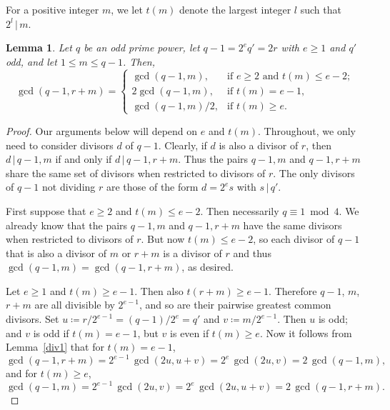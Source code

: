 \documentclass[12pt]{article}
\newtheorem{lemma}[theorem]{Lemma}
\theoremstyle{definition}\newtheorem{definition}{Definition}[section]
\begin{document}
For a positive integer $m$, we let $t(m)$ denote the largest integer $l$ such that $2^l\,|\,m$. 

\begin{lemma}
\label{gcdlem}
Let $q$ be an odd prime power, let $q-1=2^{e}q'=2r$ with $e\geq 1$ and $q'$ odd, and let $1\leq m\leq q-1$. Then, 
\[
	\gcd(q - 1, r + m) = \begin{cases}
		\gcd(q - 1, m), & \text{if $e \geq 2$ and $t(m) \leq e - 2$}; \\ 
		2\gcd(q - 1, m), & \text{if $t(m) = e - 1$}, \\ 
		\gcd(q - 1, m)/2, & \text{if $t(m) \geq e$}.
	\end{cases}
\]
\end{lemma}

\begin{proof}
Our arguments below will depend on $e$ and $t(m)$. Throughout, we only need to consider divisors $d$ of $q-1$. Clearly, if $d$ is also a divisor of $r$, then $d\,|\,q-1,m$ if and only if $d\,|\,q-1, r+m$. Thus the pairs $q-1,m$ and $q-1,r+m$ share the same set of divisors when restricted to divisors of $r$. The only divisors of $q-1$ not dividing $r$ are those of the form $d=2^e s$ with $s\,|\,q'$. 

First suppose that $e\geq 2$ and $t(m)\leq e-2$. Then necessarily $q\equiv 1 \bmod 4$. We already know that the pairs $q-1,m$ and $q-1,r+m$ have the same divisors when restricted to divisors of $r$. But now $t(m)\leq e-2$, so each divisor of $q-1$ that is also a divisor of $m$ or $r+m$ is a divisor of $r$ and thus $\gcd(q-1,m)=\gcd(q-1,r+m)$, as desired.

Let $e\geq 1$ and $t(m)\geq e-1$. Then also $t(r+m)\geq e-1$. Therefore $q-1$, $m$, $r+m$ are all divisible by $2^{e-1}$, and so are their pairwise greatest common divisors. Set $u\coloneqq r/2^{e-1}=(q-1)/2^{e}=q'$ and $v\coloneqq m/2^{e-1}$. Then $u$ is odd; and $v$ is odd if $t(m)=e-1$, but $v$ is even if $t(m)\geq e$. Now it follows from Lemma~\ref{div1} that for $t(m)=e-1$,
\[\gcd(q-1,r+m)=2^{e-1}\,\gcd(2u,u+v)= 2^{e}\,\gcd(2u,v)=2\,\gcd(q-1,m),\]
and for $t(m)\geq e$,
\[\gcd(q-1,m)=2^{e-1}\,\gcd(2u,v)=2^e\,\gcd(2u,u+v)=2\,\gcd(q-1,r+m).\] 
\end{proof}
\smallskip
\end{document}
